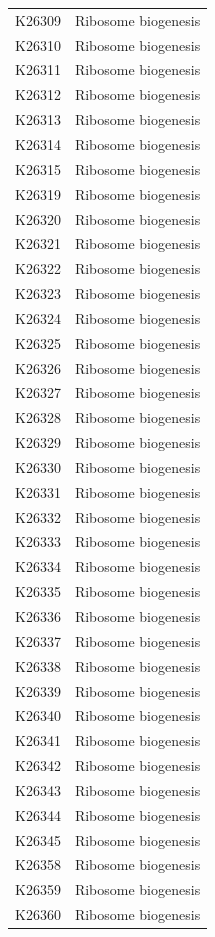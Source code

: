 \begin{longtable}{@{}l l@{}}
K26309 & Ribosome biogenesis \\
K26310 & Ribosome biogenesis \\
K26311 & Ribosome biogenesis \\
K26312 & Ribosome biogenesis \\
K26313 & Ribosome biogenesis \\
K26314 & Ribosome biogenesis \\
K26315 & Ribosome biogenesis \\
K26319 & Ribosome biogenesis \\
K26320 & Ribosome biogenesis \\
K26321 & Ribosome biogenesis \\
K26322 & Ribosome biogenesis \\
K26323 & Ribosome biogenesis \\
K26324 & Ribosome biogenesis \\
K26325 & Ribosome biogenesis \\
K26326 & Ribosome biogenesis \\
K26327 & Ribosome biogenesis \\
K26328 & Ribosome biogenesis \\
K26329 & Ribosome biogenesis \\
K26330 & Ribosome biogenesis \\
K26331 & Ribosome biogenesis \\
K26332 & Ribosome biogenesis \\
K26333 & Ribosome biogenesis \\
K26334 & Ribosome biogenesis \\
K26335 & Ribosome biogenesis \\
K26336 & Ribosome biogenesis \\
K26337 & Ribosome biogenesis \\
K26338 & Ribosome biogenesis \\
K26339 & Ribosome biogenesis \\
K26340 & Ribosome biogenesis \\
K26341 & Ribosome biogenesis \\
K26342 & Ribosome biogenesis \\
K26343 & Ribosome biogenesis \\
K26344 & Ribosome biogenesis \\
K26345 & Ribosome biogenesis \\
K26358 & Ribosome biogenesis \\
K26359 & Ribosome biogenesis \\
K26360 & Ribosome biogenesis \\

\end{longtable}
